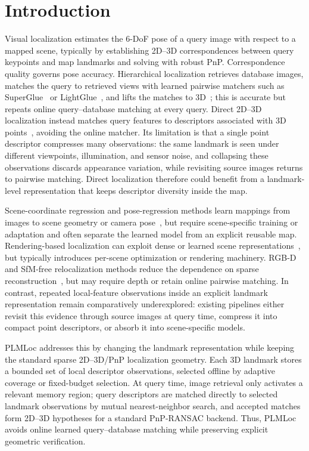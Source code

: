 \documentclass[letterpaper,10 pt,conference]{ieeeconf}
\newcommand{\method}{PLMLoc}
\begin{document}
\section{Introduction}

Visual localization estimates the 6-DoF pose of a query image with respect to a mapped scene, typically by establishing 2D--3D correspondences between query keypoints and map landmarks and solving with robust PnP. Correspondence quality governs pose accuracy. Hierarchical localization retrieves database images, matches the query to retrieved views with learned pairwise matchers such as SuperGlue~\cite{sarlin2020superglue} or LightGlue~\cite{lindenberger2023lightglue}, and lifts the matches to 3D~\cite{sarlin2019hloc}; this is accurate but repeats online query--database matching at every query. Direct 2D--3D localization instead matches query features to descriptors associated with 3D points~\cite{sattler2011fast,sattler2012active}, avoiding the online matcher. Its limitation is that a single point descriptor compresses many observations: the same landmark is seen under different viewpoints, illumination, and sensor noise, and collapsing these observations discards appearance variation, while revisiting source images returns to pairwise matching. Direct localization therefore could benefit from a landmark-level representation that keeps descriptor diversity inside the map.

Scene-coordinate regression and pose-regression methods learn mappings from images to scene geometry or camera pose~\cite{brachmann2021dsacstar,brachmann2023ace}, but require scene-specific training or adaptation and often separate the learned model from an explicit reusable map. Rendering-based localization can exploit dense or learned scene representations~\cite{polizzi2025favor}, but typically introduces per-scene optimization or rendering machinery. RGB-D and SfM-free relocalization methods reduce the dependence on sparse reconstruction~\cite{glocker2013relocalization,dong2023lazyloc}, but may require depth or retain online pairwise matching. In contrast, repeated local-feature observations inside an explicit landmark representation remain comparatively underexplored: existing pipelines either revisit this evidence through source images at query time, compress it into compact point descriptors, or absorb it into scene-specific models.

\method{} addresses this by changing the landmark representation while keeping the standard sparse 2D--3D/PnP localization geometry. Each 3D landmark stores a bounded set of local descriptor observations, selected offline by adaptive coverage or fixed-budget selection. At query time, image retrieval only activates a relevant memory region; query descriptors are matched directly to selected landmark observations by mutual nearest-neighbor search, and accepted matches form 2D--3D hypotheses for a standard PnP-RANSAC backend. Thus, \method{} avoids online learned query--database matching while preserving explicit geometric verification.
\end{document}
